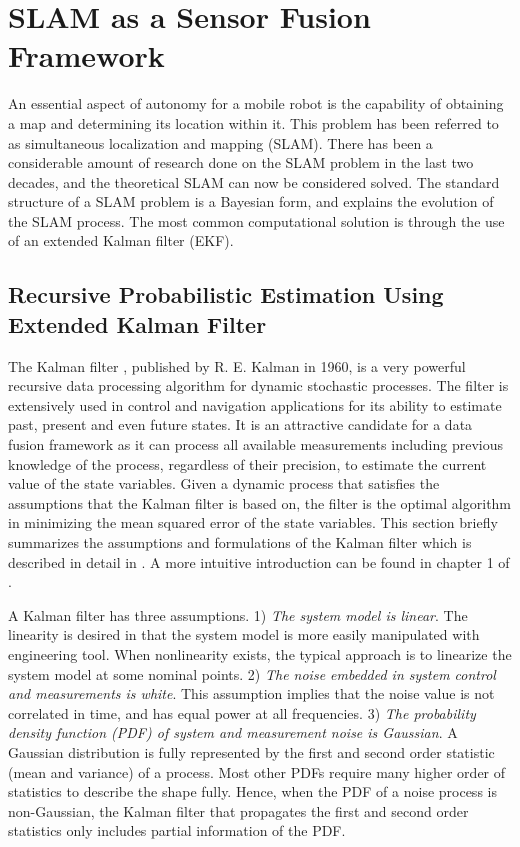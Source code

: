 \section{SLAM as a Sensor Fusion Framework}
\label{sec:SLAM}
An essential aspect of autonomy for a mobile robot is the capability
of obtaining a map and determining its location within it. This problem
has been referred to as simultaneous localization and mapping
(SLAM). There has been a considerable amount of research done on the SLAM
problem in the last two decades, and the theoretical SLAM can now be
considered solved. The standard structure of a SLAM problem is a
Bayesian form, and explains the evolution of the SLAM process. The most
common computational solution is through the use of an extended
Kalman filter (EKF).

\subsection{Recursive Probabilistic Estimation Using Extended Kalman Filter}
\label{sec:SLAM_using_EKF}

The Kalman filter \cite{kalman_new_1960}, published by R. E. Kalman in
1960, is a very powerful recursive data processing algorithm for
dynamic stochastic processes. The filter is extensively used in
control and navigation applications for its ability to estimate past,
present and even future states. It is an attractive candidate for a
data fusion framework as it can process all available measurements
including previous knowledge of the process, regardless of their
precision, to estimate the current value of the state variables. Given
a dynamic process that satisfies the assumptions that the Kalman
filter is based on, the filter is the optimal algorithm in minimizing
the mean squared error of the state variables. This section briefly
summarizes the assumptions and formulations of the Kalman filter which
is described in detail in \cite{sorenson_least-squares_1970}
\cite{analytic_sciences_corporation_applied_1974}
\cite{grewal_kalman_1993} \cite{lewis_optimal_1986}
\cite{brown_introduction_1993}. A more intuitive introduction can be
found in chapter 1 of \cite{maybeck_stochastic_1979}.


A Kalman filter has three assumptions. 1) \textit{The system model is
  linear}. The linearity is desired in that the system model is more
easily manipulated with engineering tool. When nonlinearity exists,
the typical approach is to linearize the system model at some nominal
points. 2) \textit{The noise embedded in system control and
  measurements is white}. This assumption implies that the noise value
is not correlated in time, and has equal power at all frequencies. 3)
\textit{The probability density function (PDF) of system and
  measurement noise is Gaussian}. A Gaussian distribution is fully
represented by the first and second order statistic (mean and
variance) of a process. Most other PDFs require many higher 
order of statistics to describe the shape fully. Hence, when the PDF
of a noise process is non-Gaussian, the Kalman filter that propagates
the first and second order statistics only includes partial information
of the PDF.

